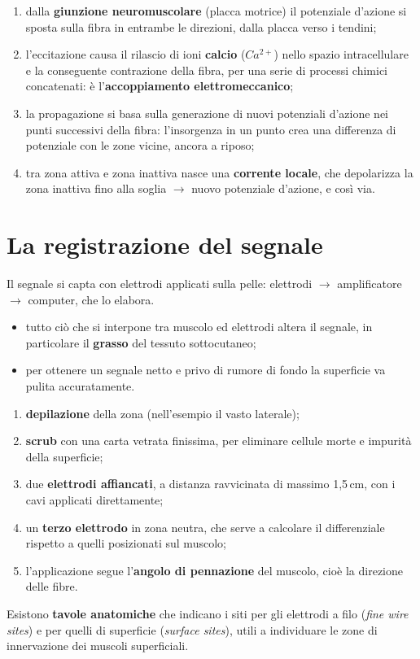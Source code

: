 \begin{enumerate}
  \item dalla \textbf{giunzione neuromuscolare} (placca motrice) il potenziale d'azione si sposta
    sulla fibra in entrambe le direzioni, dalla placca verso i tendini;
  \item l'eccitazione causa il rilascio di ioni \textbf{calcio} ($Ca^{2+}$) nello spazio
    intracellulare e la conseguente contrazione della fibra, per una serie di processi chimici
    concatenati: è l'\textbf{accoppiamento elettromeccanico};
  \item la propagazione si basa sulla generazione di nuovi potenziali d'azione nei punti successivi
    della fibra: l'insorgenza in un punto crea una differenza di potenziale con le zone vicine,
    ancora a riposo;
  \item tra zona attiva e zona inattiva nasce una \textbf{corrente locale}, che depolarizza la zona
    inattiva fino alla soglia $\rightarrow$ nuovo potenziale d'azione, e così via.
\end{enumerate}

\section{La registrazione del segnale}

Il segnale si capta con elettrodi applicati sulla pelle: elettrodi $\rightarrow$ amplificatore
$\rightarrow$ computer, che lo elabora.

\begin{itemize}
  \item tutto ciò che si interpone tra muscolo ed elettrodi altera il segnale, in particolare il
    \textbf{grasso} del tessuto sottocutaneo;
  \item per ottenere un segnale netto e privo di rumore di fondo la superficie va pulita
    accuratamente.
\end{itemize}

\begin{enumerate}
  \item \textbf{depilazione} della zona (nell'esempio il vasto laterale);
  \item \textbf{scrub} con una carta vetrata finissima, per eliminare cellule morte e impurità della
    superficie;
  \item due \textbf{elettrodi affiancati}, a distanza ravvicinata di massimo 1,5\,cm, con i cavi
    applicati direttamente;
  \item un \textbf{terzo elettrodo} in zona neutra, che serve a calcolare il differenziale rispetto
    a quelli posizionati sul muscolo;
  \item l'applicazione segue l'\textbf{angolo di pennazione} del muscolo, cioè la direzione delle
    fibre.
\end{enumerate}
Esistono \textbf{tavole anatomiche} che indicano i siti per gli elettrodi a filo (\textit{fine wire
sites}) e per quelli di superficie (\textit{surface sites}), utili a individuare le zone di
innervazione dei muscoli superficiali.

